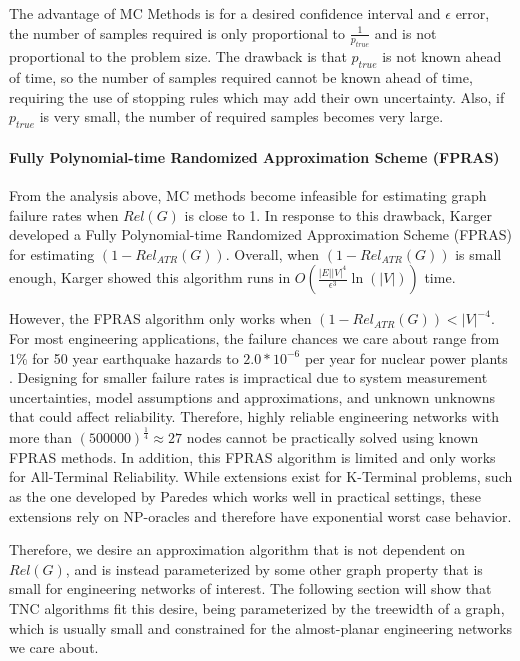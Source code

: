 \documentclass[12pt,twocolumn]{article}
\begin{document}
The advantage of MC Methods is for a desired confidence interval and \(\epsilon\) error, the number of samples required is only proportional to \(\frac{1}{p_{true}}\) and is not proportional to the problem size. The drawback is that \(p_{true}\) is not known ahead of time, so the number of samples required cannot be known ahead of time, requiring the use of stopping rules which may add their own uncertainty. Also, if \(p_{true}\) is very small, the number of required samples becomes very large.

\hypertarget{fully-polynomial-time-randomized-approximation-scheme-fpras}{%
\paragraph{\texorpdfstring{Fully Polynomial-time Randomized Approximation Scheme (FPRAS)\\
}{Fully Polynomial-time Randomized Approximation Scheme (FPRAS) }}\label{fully-polynomial-time-randomized-approximation-scheme-fpras}}

From the analysis above, MC methods become infeasible for estimating graph failure rates when \(Rel(G)\) is close to 1. In response to this drawback, Karger \cite{karger2001randomized} developed a Fully Polynomial-time Randomized Approximation Scheme (FPRAS) for estimating \((1-Rel_{ATR}(G))\). Overall, when \((1-Rel_{ATR}(G))\) is small enough, Karger showed this algorithm runs in \(O(\frac{|E||V|^4}{\epsilon^3}\ln(|V|))\) time.

However, the FPRAS algorithm only works when \((1-Rel_{ATR}(G))<|V|^{-4}\). For most engineering applications, the failure chances we care about range from 1\% for 50 year earthquake hazards \cite{IBC_2017} to \(2.0*10^{-6}\) per year for nuclear power plants \cite{NRC_2010}. Designing for smaller failure rates is impractical due to system measurement uncertainties, model assumptions and approximations, and unknown unknowns that could affect reliability. Therefore, highly reliable engineering networks with more than \((500000)^{\frac{1}{4}} \approx 27\) nodes cannot be practically solved using known FPRAS methods. In addition, this FPRAS algorithm is limited and only works for All-Terminal Reliability. While extensions exist for K-Terminal problems, such as the one developed by Paredes \cite{paredes2019principled} which works well in practical settings, these extensions rely on NP-oracles and therefore have exponential worst case behavior.

Therefore, we desire an approximation algorithm that is not dependent on \(Rel(G)\), and is instead parameterized by some other graph property that is small for engineering networks of interest. The following section will show that TNC algorithms fit this desire, being parameterized by the treewidth of a graph, which is usually small and constrained for the almost-planar engineering networks we care about.
\end{document}
